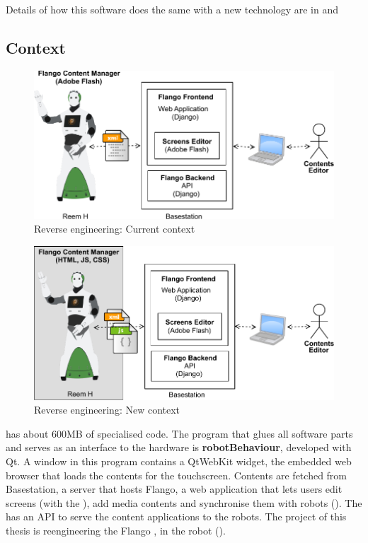 Details of how this software does the same with a new technology are in  and 

\subsection{Context}
\label{sec:context}

\begin{figure}[htb]
    \centering
    \includegraphics{figures/context-original.pdf}
    \caption{Reverse engineering: Current context}
    \label{fig:context-original}
\end{figure}

\begin{figure}[htb]
    \centering
    \includegraphics{figures/context-new.pdf}
    \caption{Reverse engineering: New context}
    \label{fig:context-new}
\end{figure}

 has about 600MB of specialised code.
The program that glues all software parts and serves as an interface to the hardware is \textbf{robotBehaviour}, developed with Qt.
A window in this program contains a QtWebKit widget, the embedded web browser that loads the contents for the touchscreen.
Contents are fetched from Basestation, a server that hosts Flango, a web application that lets users edit screens (with the \se), add media contents and synchronise them with robots ().
The \flangobe has an \ac{API} to serve the content applications to the robots.
The project of this thesis is reengineering the Flango \cm , in the robot ().

